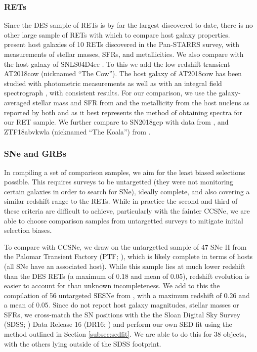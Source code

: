 \documentclass[fleqn,usenatbib,]{mnras}
\begin{document}
\subsubsection{RETs \label{subsubsec:compare_rets}}
Since the DES sample of RETs is by far the largest discovered to date, there is no other large sample of RETs with which to compare host galaxy properties. \citet{Drout2014} present host galaxies of 10 RETs discovered in the Pan-STARRS survey, with measurements of stellar masses, SFRs, and metallicities. We also compare with the host galaxy of SNLS04D4ec \citep{Arcavi2016}. To this we add the low-redshift transient AT2018cow (nicknamed ``The Cow''). The host galaxy of AT2018cow has been studied with photometric measurements \citep{Perley2019} as well as with an integral field spectrograph \citep{Lyman2020}, with consistent results. For our comparison, we use the galaxy-averaged stellar mass and SFR from \citet{Lyman2020} and the metallicity from the host nucleus as reported by both \citet{Morokuma-Matsui2019} and \citet{Lyman2020} as it best represents the method of obtaining spectra for our RET sample. We further compare to SN2018gep with data from  \citet{Ho2019}, and ZTF18abvkwla (nicknamed ``The Koala'') from \citet{Ho2020}.

\subsubsection{SNe and GRBs \label{subsubsec:compare_CCSNe}}

In compiling a set of comparison samples, we aim for the least biased selections possible. This requires surveys to be untargetted (they were not monitoring certain galaxies in order to search for SNe), ideally complete, and also covering a similar redshift range to the RETs. While in practice the second and third of these criteria are difficult to achieve, particularly with the fainter CCSNe, we are able to choose comparison samples from untargetted surveys to mitigate initial selection biases.

To compare with CCSNe, we draw on the untargetted sample of 47 SNe II from the Palomar Transient Factory (PTF; \citealt{Stoll2013}), which is likely complete in terms of hosts (all SNe have an associated host). While this sample lies at much lower redshift than the DES RETs (a maximum of 0.18 and mean of 0.05), redshift evolution is easier to account for than unknown incompleteness. We add to this the compilation of 56 untargeted SESNe from \citet{Sanders2012}, with a maximum redshift of 0.26 and a mean of 0.05. Since \citet{Sanders2012} do not report host galaxy magnitudes, stellar masses or SFRs, we cross-match the SN positions with the the Sloan Digital Sky Survey (SDSS; \citealt{York2000}) Data Release 16 (DR16; \citealt{Ahumada2019}) and perform our own SED fit using the method outlined in Section \ref{subsec:sedfit}. We are able to do this for 38 objects, with the others lying outside of the SDSS footprint.
\end{document}
